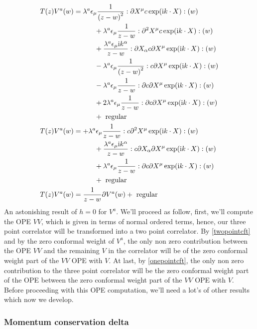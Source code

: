 \begin{align*}
    T\qty(z) V^a\qty(w)&=\lambda^a\epsilon_\mu\frac{1}{\qty(z-w)^2}:{\partial X^\mu c\exp(\textnormal{i} k\cdot X)}:(w)\\
    &\quad\quad\quad+\lambda^a\epsilon_\mu\frac{1}{z-w}:{\partial^2 X^\mu c\exp(\textnormal{i} k\cdot X)}:(w)\\
    &\quad\quad\quad+\frac{\lambda^a\epsilon_\mu\textnormal{i} k^\alpha}{z-w}:{\partial X_\alpha c\partial X^\mu\exp(\textnormal{i} k\cdot X)}:(w)\\
    &\quad\quad\quad-\lambda^a\epsilon_\mu\frac{1}{\qty(z-w)^2}:c\partial X^\mu\exp(\textnormal{i} k\cdot X):(w)\\
    &\quad\quad\quad-\lambda^a\epsilon_\mu\frac{1}{z-w}:\partial c\partial X^\mu\exp(\textnormal{i} k\cdot X):(w)\\
    &\quad\quad\quad+2\lambda^a\epsilon_\mu\frac{1}{z-w}:\partial c\partial X^\mu\exp(\textnormal{i} k\cdot X):(w)\\
    &\quad\quad\quad+\textnormal{ regular}\\
    T\qty(z) V^a\qty(w)&=+\lambda^a\epsilon_\mu\frac{1}{z-w}:{c\partial^2 X^\mu \exp(\textnormal{i} k\cdot X)}:(w)\\
    &\quad\quad\quad+\frac{\lambda^a\epsilon_\mu\textnormal{i} k^\alpha}{z-w}:{c\partial X_\alpha \partial X^\mu\exp(\textnormal{i} k\cdot X)}:(w)\\
    &\quad\quad\quad+\lambda^a\epsilon_\mu\frac{1}{z-w}:\partial c\partial X^\mu\exp(\textnormal{i} k\cdot X):(w)\\
    &\quad\quad\quad+\textnormal{ regular}\\
    T\qty(z) V^a\qty(w)&=\frac{1}{z-w}\partial V^a\qty(w)+\textnormal{ regular}
\end{align*}
An astonishing result of $h=0$ for $V^a$. We'll proceed as follow, first, we'll compute the OPE $VV$, 
which is given in terms of normal ordered terms, hence, our three point correlator will be transformed into a 
two point correlator. By \cref{twopointcft} and by the zero conformal weight of $V^a$, the only non zero contribution 
between the OPE $VV$ and the remaining $V$ in the correlator will be of the zero conformal weight part of the $VV$ 
OPE with $V$. At last, by \cref{onepointcft}, the only non zero contribution to the three point correlator will 
be the zero conformal weight part of the OPE between the zero conformal weight part of the $VV$ OPE 
with $V$. Before proceeding with this OPE computation, we'll need a lot's of other results which now we 
develop.

\subsubsection{Momentum conservation delta}

